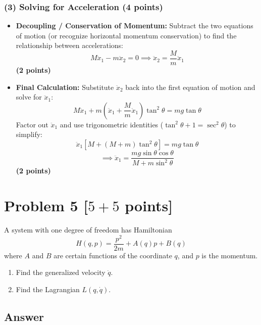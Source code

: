 \documentclass[11pt, a4paper]{article} %
\begin{document}
\subsubsection*{(3) Solving for Acceleration (4 points)}
\begin{itemize}
    \item \textbf{Decoupling / Conservation of Momentum:} 
    Subtract the two equations of motion (or recognize horizontal momentum conservation) to find the relationship between accelerations:
    \[ M\ddot{x}_1 - m\ddot{x}_2 = 0 \implies \ddot{x}_2 = \frac{M}{m}\ddot{x}_1 \]
    \hfill \textbf{(2 points)}
    
    \item \textbf{Final Calculation:} 
    Substitute $\ddot{x}_2$ back into the first equation of motion and solve for $\ddot{x}_1$:
    \[ M\ddot{x}_1 + m\left( \ddot{x}_1 + \frac{M}{m}\ddot{x}_1 \right)\tan^2\theta = mg\tan\theta \]
    Factor out $\ddot{x}_1$ and use trigonometric identities ($\tan^2\theta + 1 = \sec^2\theta$) to simplify:
    \[ \ddot{x}_1 \left[ M + (M+m)\tan^2\theta \right] = mg\tan\theta \]
    \[ \implies \ddot{x}_1 = \frac{mg \sin \theta \cos \theta}{M + m \sin^2 \theta} \]
    \hfill \textbf{(2 points)}
\end{itemize}

\newpage
\section*{Problem 5 [$5+5$ points]}
A system with one degree of freedom has Hamiltonian 
\begin{equation*}
    H(q,p) = \frac{p^2}{2m} + A(q)p + B(q)
\end{equation*}
where $A$ and $B$ are certain functions of the coordinate $q$, and $p$ is the momentum.

\begin{enumerate}
\item[(1)] Find the generalized velocity $\dot{q}$.

\item[(2)]  Find the Lagrangian $L(q, \dot{q})$.
\end{enumerate}

\subsection*{Answer}
\end{document}
